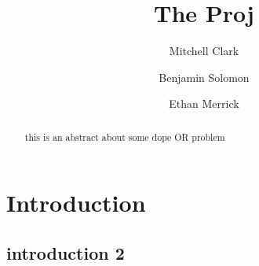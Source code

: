 \documentclass[reqno]{amsart}
\theoremstyle{plain}
\theoremstyle{definition}
\numberwithin{equation}{section}
\begin{document}
	\title[]{The Proj}
	
	\author[M.~Clark]{Mitchell Clark}
	\author[B.~Solomon]{Benjamin Solomon}
    \author[E.~Merrick]{Ethan Merrick}
	
	\subjclass[2010]{}
	
	
	\begin{abstract}
    this is an abstract about some dope OR problem
	\end{abstract}
	
	\maketitle
	
	\setcounter{tocdepth}{1}
	\tableofcontents
	\section{Introduction}
	

	\subsection{introduction 2}

	
	\appendix
	
	
	{}
\end{document}
